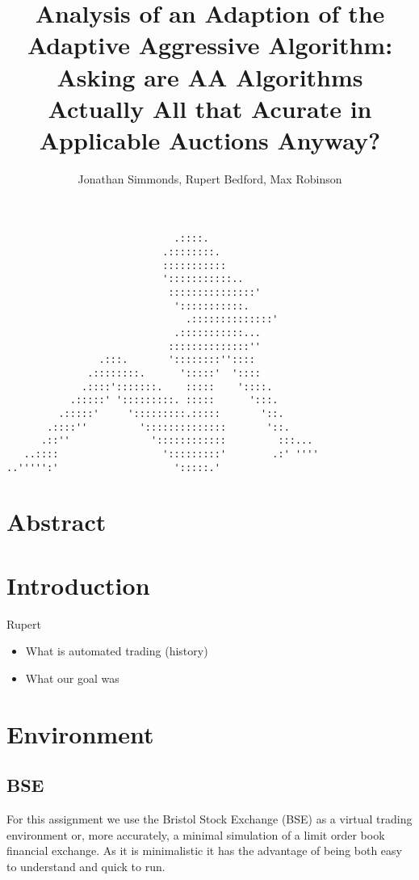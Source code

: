 \documentclass[12pt]{article} %
\title{Analysis of an Adaption of the Adaptive Aggressive Algorithm: Asking are AA Algorithms Actually All that Acurate in Applicable Auctions Anyway?}
\author{Jonathan Simmonds, Rupert Bedford, Max Robinson}
\date{} %
\begin{document}
\maketitle{}
\vspace{3cm}
\begin{verbatim}
                             .::::. 
                           .::::::::. 
                           ::::::::::: 
                           ':::::::::::.. 
                            :::::::::::::::' 
                             ':::::::::::. 
                               .::::::::::::::' 
                             .:::::::::::... 
                            ::::::::::::::'' 
                .:::.       '::::::::'':::: 
              .::::::::.      ':::::'  ':::: 
             .::::':::::::.    :::::    '::::. 
           .:::::' ':::::::::. :::::      ':::. 
         .:::::'     ':::::::::.:::::       '::. 
       .::::''         '::::::::::::::       '::. 
      .::''              '::::::::::::         :::... 
   ..::::                  ':::::::::'        .:' '''' 
..''''':'                    ':::::.' 
\end{verbatim}

\pagebreak

\section{Abstract}


\section{Introduction}
Rupert
\begin{itemize} \itemsep0pt
	\item What is automated trading (history)
	\item What our goal was
\end{itemize}


\section{Environment}
\subsection{BSE}
For this assignment we use the Bristol Stock Exchange (BSE) as a virtual trading environment or, 
more accurately, a minimal simulation of a limit order book financial exchange. As it is 
minimalistic it has the advantage of being both easy to understand and quick to run.
\end{document}
